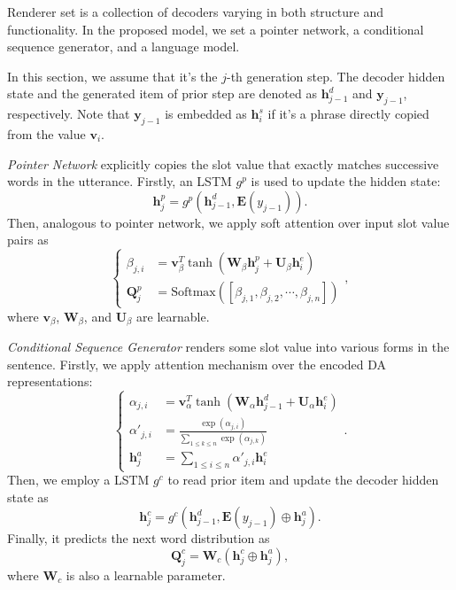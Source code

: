 \documentclass[letterpaper]{article} %
\begin{document}
	Renderer set is a collection of decoders varying in both structure and functionality. In the proposed model, we set a pointer network, a conditional sequence generator, and a language model.

	In this section, we assume that it's the $j$-th generation step. The decoder hidden state and the generated item of prior step are denoted as $\mathbf{h}_{j-1}^d$ and $\mathbf{y}_{j-1}$, respectively. Note that $\mathbf{y}_{j-1}$ is embedded as $\mathbf{h}_i^s$ if it's a phrase directly copied from the value $\mathbf{v}_i$.

	\textit{Pointer Network} explicitly copies the slot value that exactly matches successive words in the utterance. Firstly, an LSTM $g^{p}$ is used to update the hidden state:
	\begin{equation}
	\mathbf{h}_j^p = g^p(\mathbf{h}_{j-1}^d, \mathbf{E}(y_{j-1})).
	\end{equation}
	Then, analogous to pointer network, we apply soft attention over input slot value pairs as
	\begin{equation}
	\left\{\begin{aligned}
	\beta_{j,i} & = \mathbf{v}^T_{\beta} \tanh(\mathbf{W}_{\beta} \mathbf{h}^p_{j} + \mathbf{U}_{\beta}\mathbf{h}^e_i) \\
	\mathbf{Q}^p_j & = \mathrm{Softmax}([\beta_{j, 1}, \beta_{j, 2}, \cdots, \beta_{j, n}])
	\end{aligned}\right.,
	\end{equation}
	where $\mathbf{v}_{\beta}$, $\mathbf{W}_{\beta}$, and $\mathbf{U}_{\beta}$ are learnable.

	\textit{Conditional Sequence Generator} renders some slot value into various forms in the sentence. Firstly, we apply attention mechanism over the encoded DA representations:
	\begin{equation}
	\left\{\begin{aligned}
	\alpha_{j,i} & = \mathbf{v}^T_{\alpha} \tanh(\mathbf{W}_{\alpha} \mathbf{h}^d_{j - 1} + \mathbf{U}_{\alpha}\mathbf{h}^e_i) \\
	\alpha'_{j,i} & = \frac{\exp(\alpha_{j,i})}{\sum_{1 \le k \le n} \exp(\alpha_{j,k})} \\
	\mathbf{h}^a_j & = \sum_{1 \le i \le n} \alpha'_{j,i} \mathbf{h}_i^e
	\end{aligned}\right..
	\end{equation}
	Then, we employ a LSTM $g^c$ to read prior item and update the decoder hidden state as
	\begin{equation}
	\mathbf{h}_j^c = g^c(\mathbf{h}_{j-1}^d, \mathbf{E}(y_{j-1}) \oplus \mathbf{h}^a_j).
	\end{equation}
	Finally, it predicts the next word distribution as
	\begin{equation}
	\mathbf{Q}_j^c = \mathbf{W}_{c} (\mathbf{h}^c_j \oplus \mathbf{h}^a_j),
	\end{equation}
	where $\mathbf{W}_{c}$ is also a learnable parameter.
\end{document}
